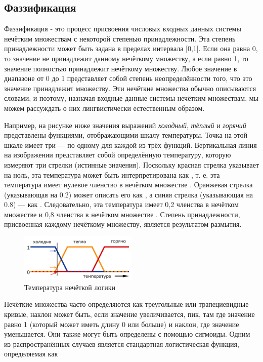 \documentclass[a4paper,12pt]{report}
\begin{document}
\subsection{Фаззификация}
Фаззификация - это процесс присвоения числовых входных данных системы нечётким множествам с некоторой степенью принадлежности. Эта степень принадлежности может быть задана в пределах интервала [0,1]. Если она равна 0, то значение не принадлежит данному нечёткому множеству, а если равно 1, то значение полностью принадлежит нечёткому множеству. Любое значение в диапазоне от 0 до 1 представляет собой степень неопределённости того, что это значение принадлежит множеству. Эти нечёткие множества обычно описываются словами, и поэтому, назначая входные данные системы нечётким множествам, мы можем рассуждать о них лингвистически естественным образом.

Например, на рисунке ниже значения выражений \textit{холодный}, \textit{тёплый} и \textit{горячий} представлены функциями, отображающими шкалу температуры. Точка на этой шкале имеет три  --- по одному для каждой из трёх функций. Вертикальная линия на изображении представляет собой определённую температуру, которую измеряют три стрелки (истинные значения). Поскольку красная стрелка указывает на ноль, эта температура может быть интерпретирована как , т. е. эта температура имеет нулевое членство в нечётком множестве . Оранжевая стрелка (указывающая на 0.2) может описать его как , а синяя стрелка (указывающая на 0.8) --- как . Следовательно, эта температура имеет 0,2 членства в нечётком множестве  и 0,8 членства в нечётком множестве . Степень принадлежности, присвоенная каждому нечёткому множеству, является результатом размытия.

\begin{figure}[H]
	\centering
	\includegraphics[width=0.5\textwidth,keepaspectratio]{temp_example}
	\caption{Температура нечёткой логики}
\end{figure}

Нечёткие множества часто определяются как треугольные или трапециевидные кривые, наклон может быть, если значение увеличивается, пик, там где значение равно 1 (который может иметь длину 0 или больше) и наклон, где значение уменьшается. Они также могут быть определены с помощью сигмоиды. Одним из распространённых случаев является стандартная логистическая функция, определяемая как
\end{document}
